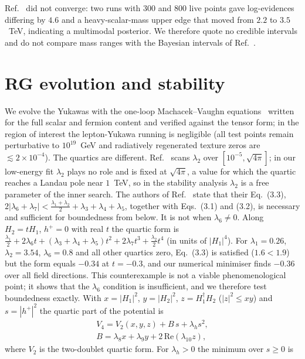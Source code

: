 \documentclass[twocolumn,epjc3]{svjour3}
\newcommand{\HG}{Ref.~\cite{HerreroGarcia:2017xdq}}
\begin{document}
\HG{} did not converge: two runs with $300$ and $800$ live points gave log-evidences differing by $4.6$ and a heavy-scalar-mass upper edge that moved from $2.2$ to $3.5$~TeV, indicating a multimodal posterior. We therefore quote no credible intervals and do not compare mass ranges with the Bayesian intervals of \HG{}.

\section{RG evolution and stability}\label{sec:rg}
We evolve the Yukawas with the one-loop Machacek--Vaughn equations~\cite{Machacek:1983tz} written for the full scalar and fermion content and verified against the tensor form; in the region of interest the lepton-Yukawa running is negligible (all test points remain perturbative to $10^{19}$~GeV and radiatively regenerated texture zeros are $\lesssim2\times10^{-4}$). The quartics are different. \HG{} scans $\lambda_2$ over $[10^{-5},\sqrt{4\pi}]$; in our low-energy fit $\lambda_2$ plays no role and is fixed at $\sqrt{4\pi}$, a value for which the quartic reaches a Landau pole near $1$~TeV, so in the stability analysis $\lambda_2$ is a free parameter of the inner search. The authors of \HG{} state that their Eq.~(3.3), $2|\lambda_6+\lambda_7|<\frac{\lambda_1+\lambda_2}{2}+\lambda_3+\lambda_4+\lambda_5$, together with Eqs.~(3.1) and (3.2), is necessary and sufficient for boundedness from below. It is not when $\lambda_6\ne0$. Along $H_2=tH_1$, $h^+=0$ with real $t$ the quartic form is $\frac{\lambda_1}{2}+2\lambda_6t+(\lambda_3+\lambda_4+\lambda_5)t^2+2\lambda_7t^3+\frac{\lambda_2}{2}t^4$ (in units of $|H_1|^4$). For $\lambda_1=0.26$, $\lambda_2=3.54$, $\lambda_6=0.8$ and all other quartics zero, Eq.~(3.3) is satisfied ($1.6<1.9$) but the form equals $-0.34$ at $t=-0.3$, and our numerical minimiser finds $-0.36$ over all field directions. This counterexample is not a viable phenomenological point; it shows that the $\lambda_6$ condition is insufficient, and we therefore test boundedness exactly. With $x=|H_1|^2$, $y=|H_2|^2$, $z=H_1^\dagger H_2$ ($|z|^2\le xy$) and $s=|h^+|^2$ the quartic part of the potential is
\begin{equation}
\begin{gathered}V_4=V_2(x,y,z)+B\,s+\lambda_hs^2,\\ B=\lambda_8x+\lambda_9y+2\,\mathrm{Re}(\lambda_{10}z),\end{gathered}
\end{equation}
where $V_2$ is the two-doublet quartic form. For $\lambda_h>0$ the minimum over $s\ge0$ is
\end{document}
